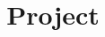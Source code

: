 \documentclass[a4paper,10pt]{article}
\title{Project}
\author{}
\begin{document}
\maketitle

\begin{abstract}

\end{abstract}

\section{}
\end{document}
